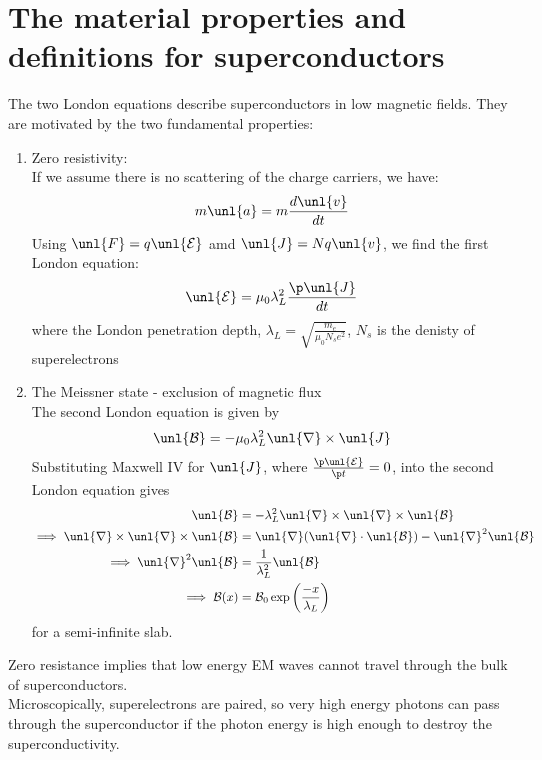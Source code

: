 \documentclass[a4paper, 11pt, normalem]{report}
\renewcommand\E{\mathcal{E}}
\newcommand\uE{\unl{\E}}
\renewcommand\B{\mathcal{B}}
\newcommand\uB{\unl{\B}}
\renewcommand\del{\unl{\nabla}}
\newcommand\J{\unl{J}}
\newcommand\pen{\lambda_L}
\begin{document}
\section{The material properties and definitions for superconductors}
The two London equations describe superconductors in low magnetic fields.
They are motivated by the two fundamental properties:
\begin{enumerate}
	\item Zero resistivity: \\
	If we assume there is no scattering of the charge carriers, we have:
	\begin{equation}
		m\unl{a} = m\frac{d\unl{v}}{dt}
	\end{equation}
	Using $\unl{F} = q\uE$ amd $\J = Nq\unl{v}$, we find the first London equation:
	\begin{equation}
		\uE = \mu_0\lambda_L^2\frac{\p \J}{dt}
	\end{equation}
	where the London penetration depth, $\pen = \sqrt{\frac{m_e}{\mu_0N_se^2}}$, $N_s$ is the denisty of superelectrons
	\item The Meissner state - exclusion of magnetic flux \\
	The second London equation is given by
	\begin{equation}
		\uB = -\mu_0\pen^2\del\times\J
	\end{equation}
	Substituting Maxwell \RN{4} for $\J$, where $\frac{\p\uE}{\p t} = 0$, into the second London equation gives
	\begin{align}
		\uB &= -\pen^2\del\times\del\times\uB \\
		\implies \del\times\del\times\uB &= \del(\del\cdot\uB) - \del^2\uB \\
		\implies \del^2\uB &= \frac{1}{\pen^2}\uB \\
		\implies \B(x) &= \B_0\exp\left(\frac{-x}{\pen}\right)
	\end{align}
	for a semi-infinite slab.
\end{enumerate}
Zero resistance implies that low energy EM waves cannot travel through the bulk of superconductors. \\
Microscopically, superelectrons are paired, so very high energy photons can pass through the superconductor if the photon energy is high enough to destroy the superconductivity.
\end{document}
